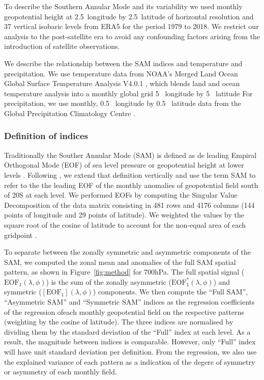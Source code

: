 \documentclass[]{ametsocV5}
\begin{document}
To describe the Southern Annular Mode and its variability we used
monthly geopotential height at 2.5\degree~longitude by
2.5\degree~latitude of horizontal resolution and 37 vertical isobaric
levels from ERA5 \citep{hersbach2020} for the period 1979 to 2018. We
restrict our analysis to the post-satellite era to avoid any confounding
factors arising from the introduction of satellite observations.

We describe the relationship between the SAM indices and temperature and
precipitation. We use temperature data from NOAA's Merged Land Ocean
Global Surface Temperature Analysis V4.0.1 \citep{vose2012, smith2008},
which blends land and ocean temperature analysis into a monthly global
grid 5\degree~ longitude by 5\degree~ latitude For precipitation, we use
monthly, 0.5\degree~ longitude by 0.5\degree~ latitude data from the
Global Precipitation Climatology Centre \citep{schneider2015}.

\subsubsection{Definition of indices}

Traditionally the Souther Annular Mode (SAM) is defined as de leading
Empiral Orthogonal Mode (EOF) of sea level pressure or geopotential
height at lower levels \citep{ho2012}. Following \citet{baldwin2001}, we
extend that definition vertically and use the term SAM to refer to the
the leading EOF of the monthly anomalies of geopotential field south of
20\degree S at each level. We performed EOFs by computing the Singular
Value Decomposition of the data matrix consisting in 481 rows and 4176
columns (144 points of longitude and 29 points of latitude). We weighted
the values by the square root of the cosine of latitude to account for
the non-equal area of each gridpoint \citep{chung1999}.

To separate between the zonally symmetric and asymmetric components of
the SAM, we computed the zonal mean and anomalies of the full SAM
spatial pattern, as shown in Figure~\ref{fig:method} for 700hPa. The
full spatial signal (\(\mathrm{EOF_1}(\lambda, \phi)\)) is the sum of
the zonally asymmetric (\(\mathrm{EOF_1^*}(\lambda, \phi)\)) and
symmetric (\([\mathrm{EOF_1}](\lambda, \phi)\)) components. We then
compute the ``Full SAM'', ``Asymmetric SAM'' and ``Symmetric SAM''
indices as the regression coefficients of the regression ofeach monthly
geopotential field on the respective patterns (weighting by the cosine
of latitude). The three indices are normalised by dividing them by the
standard deviation of the ``Full'' index at each level. As a result, the
magnitude between indices is comparable. However, only ``Full'' index
will have unit standard deviation per definition. From the regression,
we also use the explained variance of each pattern as a indication of
the degere of symmetry or asymmetry of each monthly field.
\end{document}
